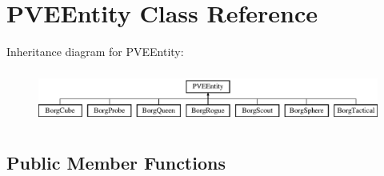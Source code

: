 \hypertarget{classPVEEntity}{
\section{PVEEntity Class Reference}
\label{df/dde/classPVEEntity}
}
Inheritance diagram for PVEEntity:\begin{figure}[H]
\begin{center}
\leavevmode
\includegraphics[height=1.75824cm]{df/dde/classPVEEntity}
\end{center}
\end{figure}
\subsection*{Public Member Functions}
